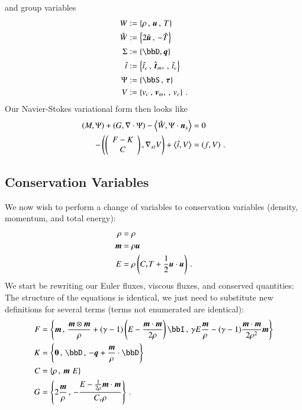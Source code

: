 \documentclass[preprint,12pt]{elsarticle}
\begin{document}
and group variables
\begin{align*}
W&:=\LRc{\rho\,,\,\bfu\,,\,T}\\
\hat W&:=\LRc{2\hat\bfu\,,\,-\hat T}\\
\Sigma&:=\LRc{\bbD,\bfq}\\
\hat t&:=\LRc{\hat t_e\,,\,\hat\bft_m,\,,\,\hat t_e}\\
\Psi&:=\LRc{\bbS\,,\,\bftau}\\
V&:=\LRc{v_c\,,\,\bfv_m,\,,\,v_e}\,.
\end{align*}
Our Navier-Stokes variational form then looks like
\begin{subequations}
\label{eq:shortFormNL}
\begin{align}
\left( M,\Psi \right)+\left( G,\nabla\cdot\Psi \right)-\left\langle \hat W,\Psi\cdot\boldsymbol n_x \right\rangle&=0\\
-\left( \left( \begin{array}{c} F-K\\ C\\ \end{array} \right),\nabla_{xt} V \right)+\left\langle \hat t,V \right\rangle&=\left( f,V \right)\,.
\end{align}
\end{subequations}

\subsection{Conservation Variables}
We now wish to perform a change of variables to conservation variables (density, momentum, and total energy):
\begin{align*}
\rho&=\rho\\
\boldsymbol m&=\rho\boldsymbol u\\
E&=\rho\left( C_v T+\frac{1}{2}\boldsymbol u\cdot\boldsymbol u \right)\,.
\end{align*}
We start be rewriting our Euler fluxes, viscous fluxes, and conserved quantities:
The structure of the equations is identical, we just need to substitute new definitions for several terms (terms not enumerated are identical):
\begin{align*}
F&=\LRc{\bfm\,,\,
\frac{\bfm\otimes\bfm}{\rho}+(\gamma-1)\LRp{E-\frac{\bfm\cdot\bfm}{2\rho}}\bbI\,,\,
\gamma E\frac{\bfm}{\rho}-(\gamma-1)\frac{\bfm\cdot\bfm}{2\rho^2}\bfm}\\
K&=\LRc{\boldsymbol 0\,,\,
\bbD\,,\,
-\bfq+\frac{\bfm}{\rho}\cdot\bbD}\\
C&=\LRc{\rho\,,\,
\bfm\,\,
E}\\
G&=\LRc{2\frac{\bfm}{\rho}\,,\,
-\frac{E-\frac{1}{2\rho}\bfm\cdot\bfm}{C_v\rho}}\,.
\end{align*}
\end{document}
